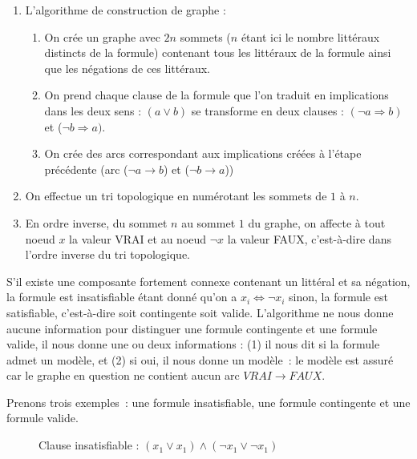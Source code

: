 \documentclass{article}
\begin{document}
\begin{enumerate}
\item L'algorithme de construction de graphe : 
\begin{enumerate}
\item On crée un graphe avec $2n$ sommets ($n$ étant ici le nombre littéraux distincts de la formule) contenant tous les littéraux de la
  formule ainsi que les négations de ces littéraux.
\item On prend chaque clause de la formule que l'on traduit en implications dans les deux sens : $(a \vee b)$ 
se transforme en deux clauses : $(\neg a \Rightarrow b)$ et ($\neg b \Rightarrow a)$.
\item On crée des arcs correspondant aux implications créées à l'étape précédente (arc ($\neg a 
\rightarrow b$) et ($\neg b \rightarrow a$))
\end{enumerate}
\item On effectue un tri topologique en numérotant les sommets de $1$ à $n$.
\item En ordre inverse, du sommet $n$ au sommet $1$ du graphe, on affecte à tout noeud $x$ la valeur VRAI et au noeud $\neg x$ la valeur
  FAUX, c'est-à-dire dans l'ordre inverse du tri topologique.
\end{enumerate}  	

S'il existe une composante fortement connexe contenant un littéral et sa négation, la formule est insatisfiable étant donné qu'on a $x_{i}
\Leftrightarrow \neg x_{i}$ sinon, la formule est satisfiable, c'est-à-dire soit contingente soit valide. L'algorithme ne nous donne aucune
information pour distinguer une formule contingente et une formule valide, il nous donne une ou deux informations : (1) il nous dit si la
formule admet un modèle, et (2) si oui, il nous donne un modèle~: le modèle est assuré car le graphe en question ne contient aucun arc $VRAI
\rightarrow FAUX$.

Prenons trois exemples~: une formule insatisfiable, une formule contingente et une formule valide.

\begin{figure}[ht!]
  \centering
  \caption{Clause insatisfiable : $(x_{1} \vee x_{1}) \wedge (\neg x_{1} \vee \neg x_{1})$}
  \label{fig:clause-insat}
\end{figure}
\end{document}
